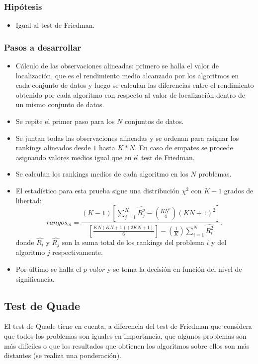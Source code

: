 \subsubsection{Hipótesis}
\begin{itemize}
\item Igual al test de Friedman.
\end{itemize}

\subsubsection{Pasos a desarrollar}
\begin{itemize}
\item Cálculo de las observaciones alineadas: primero se halla el valor de localización, que es el rendimiento
medio alcanzado por los algoritmos en cada conjunto de datos y luego se calculan las diferencias entre el
rendimiento obtenido por cada algoritmo con respecto al valor de localización dentro de un mismo conjunto de
datos.
\item Se repite el primer paso para los $N$ conjuntos de datos.
\item Se juntan todas las observaciones alineadas y se ordenan para asignar los rankings alineados desde $1$
hasta $K*N$. En caso de empates se procede asignando valores medios igual que en el test de Friedman.
\item Se calculan los rankings medios de cada algoritmo en los $N$ problemas.
\item El estadístico para esta prueba sigue una distribución $\chi^2$ con $K-1$ grados de
libertad:
\[ rangos_{al} = \frac{(K-1) \left[ \sum_{j=1}^{K} \hat{R_{j}^{2}} - (\frac{KN^2}{4})(KN+1)^2 \right]}
{\left[\frac{KN(KN+1)(2KN+1)}{6}\right] - (\frac{1}{K}) \sum_{i=1}^{N} \hat{R_{i}^{2}}}, \]
donde $\hat{R_{i}}$ y $\hat{R_{j}}$ son la suma total de los rankings del problema $i$ y del algoritmo $j$
respectivamente.
\item Por último se halla el $\textit{p-valor}$ y se toma la decisión en función del nivel de significancia.
\end{itemize}


\subsection{Test de Quade}
El test de Quade tiene en cuenta, a diferencia del test de Friedman que considera que todos los problemas son
iguales en importancia, que algunos problemas son más difíciles o que los resultados que obtienen los algoritmos
sobre ellos son más distantes (se realiza una ponderación).

